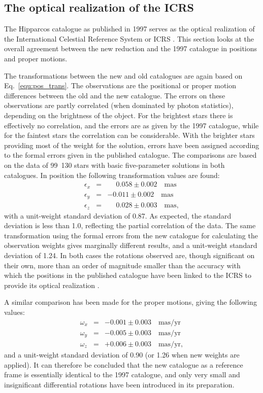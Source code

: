 \documentclass{aa}
\begin{document}
\subsection{The optical realization of the ICRS}

The Hipparcos catalogue as published in 1997 serves as the optical realization 
of the International Celestial Reference System or ICRS \citep{feiss98}. This 
section looks at the overall agreement between the new reduction and the 
1997 catalogue in positions and proper motions.

The transformations between the new and old catalogues are again based on 
Eq.~\ref{equ:pos_trans}. The observations are the positional or proper
motion differences between the old and the new catalogue. The errors on 
these observations are partly correlated (when dominated by photon statistics),
depending on the brightness of the object. For the brightest stars there is 
effectively no correlation, 
and the errors are as given by the 1997 catalogue, while for the faintest 
stars the correlation can be considerable. With the brighter stars providing
most of the weight for the solution, errors have been assigned according to
the formal errors given in the published catalogue.
The comparisons are based on the data of 99~130 stars with basic 
five-parameter solutions in both catalogues. In position the following
transformation values are found:
\begin{eqnarray}
\epsilon_x &=& \phantom{-}0.058\pm0.002\quad\mathrm{mas} \\ \nonumber %
\epsilon_y &=& -0.011\pm0.002\quad\mathrm{mas} \\ \nonumber  %
\epsilon_z &=& \phantom{-}0.028\pm0.003\quad\mathrm{mas}, %
\end{eqnarray}
with a unit-weight standard deviation of 0.87. As expected, the standard 
deviation is less than 1.0, reflecting the partial correlation of the
data. The same transformation using the formal errors from the new catalogue
for calculating the observation weights gives marginally different results,
and a unit-weight standard deviation of 1.24. In both cases the rotations
observed are, though significant on their own, more than an order of magnitude
smaller than the accuracy with which the positions in the published
catalogue have been linked to the ICRS to provide its optical realization
\citep{arias95,feiss98}.

A similar comparison has been made for the proper motions, giving the
following values:
\begin{eqnarray}
\omega_x &=& -0.001\pm0.003\quad\mathrm{mas/yr} \\ \nonumber %
\omega_y &=& -0.005\pm0.003\quad\mathrm{mas/yr} \\ \nonumber %
\omega_z &=& +0.006\pm0.003\quad\mathrm{mas/yr},  %
\end{eqnarray}
and a unit-weight standard deviation of 0.90 (or 1.26 when new weights are
applied). It can therefore be concluded that the new catalogue as a reference
frame is essentially identical to the 1997 catalogue, and only very small 
and insignificant differential rotations have been introduced in its 
preparation. 
\end{document}

